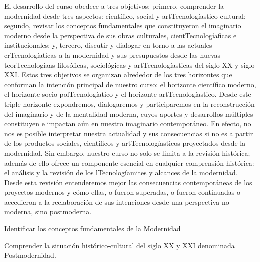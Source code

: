 \begin{syllabus}


\begin{justification}
El desarrollo del curso obedece a tres objetivos: primero, comprender la modernidad desde tres aspectos: científico, social y artTecnologíastico-cultural; segundo, revisar los conceptos fundamentales que constituyeron el imaginario moderno desde la perspectiva de sus obras culturales, cientTecnologíaficas e institucionales; y, tercero, discutir y dialogar en torno a las
actuales crTecnologíaticas a la modernidad y sus presupuestos desde las nuevas teorTecnologíaas filosóficas, sociológicas y artTecnologíasticas del siglo XX y siglo XXI. Estos tres objetivos se organizan alrededor de los tres horizontes que conforman la intención principal de nuestro curso: el
horizonte científico moderno, el horizonte socio-polTecnologíatico y el horizonte artTecnologíastico. Desde este triple horizonte expondremos, dialogaremos y participaremos en la reconstrucción
del imaginario y de la mentalidad moderna, cuyos aportes y desarrollos múltiples constituyen e impactan aún en nuestro imaginario contemporáneo. En efecto, no nos es posible interpretar nuestra actualidad y sus consecuencias si no es a partir de los productos sociales, científicos y artTecnologíasticos proyectados desde la modernidad. Sin embargo, nuestro curso no solo se limita a la revisión histórica; además de ello ofrece un
componente esencial en cualquier comprensión histórica: el análisis y la revisión de los lTecnologíamites y alcances de la modernidad. Desde esta revisión entenderemos mejor las
consecuencias contemporáneas de los proyectos modernos y cómo ellas, o fueron superadas, o fueron continuadas o accedieron a la reelaboración de sus intenciones desde una perspectiva no moderna, sino postmoderna.
\end{justification}

\begin{goals}
\item Identificar los conceptos fundamentales de la Modernidad
\item Comprender la situación histórico-cultural del siglo XX y XXI denominada Postmodernidad.
\end{goals}

\begin{outcomes}
    \item {} %
    \item {} %
    \item {} %
    \item {} %
    \item {} %
\end{outcomes}


\end{syllabus}
